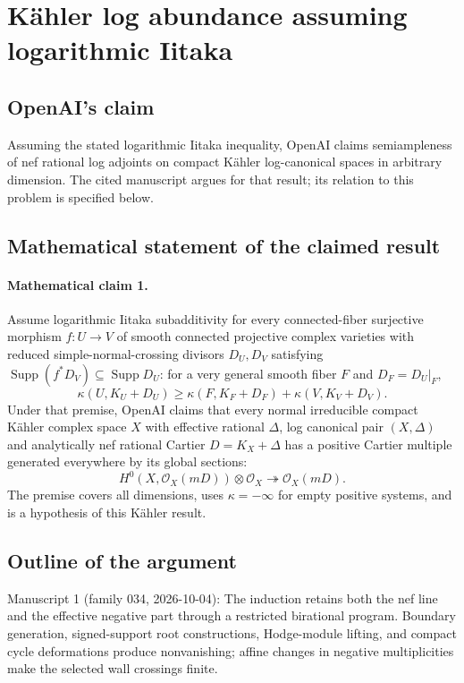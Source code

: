\documentclass[11pt]{article}
\begin{document}
\section*{Kähler log abundance assuming logarithmic Iitaka}

\subsection{OpenAI's claim}
Assuming the stated logarithmic Iitaka inequality, OpenAI claims semiampleness of nef rational log adjoints on compact Kähler log-canonical spaces in arbitrary dimension. The cited manuscript argues for that result; its relation to this problem is specified below.

\subsection{Mathematical statement of the claimed result}
\paragraph{Mathematical claim 1.} Assume logarithmic Iitaka subadditivity for every connected-fiber surjective morphism $f:U\to V$ of smooth connected projective complex varieties with reduced simple-normal-crossing divisors $D_U,D_V$ satisfying $\operatorname{Supp}(f^*D_V)\subseteq\operatorname{Supp}D_U$: for a very general smooth fiber $F$ and $D_F=D_U|_F$,
\[
\kappa(U,K_U+D_U)\ge\kappa(F,K_F+D_F)+\kappa(V,K_V+D_V).
\]
Under that premise, OpenAI claims that every normal irreducible compact Kähler complex space $X$ with effective rational $\Delta$, log canonical pair $(X,\Delta)$ and analytically nef rational Cartier $D=K_X+\Delta$ has a positive Cartier multiple generated everywhere by its global sections:
\[
H^0(X,\mathcal O_X(mD))\otimes\mathcal O_X\twoheadrightarrow\mathcal O_X(mD).
\]
The premise covers all dimensions, uses $\kappa=-\infty$ for empty positive systems, and is a hypothesis of this Kähler result.

\subsection{Outline of the argument}
Manuscript 1 (family 034, 2026-10-04): The induction retains both the nef line and the effective negative part through a restricted birational program. Boundary generation, signed-support root constructions, Hodge-module lifting, and compact cycle deformations produce nonvanishing; affine changes in negative multiplicities make the selected wall crossings finite.
\end{document}
